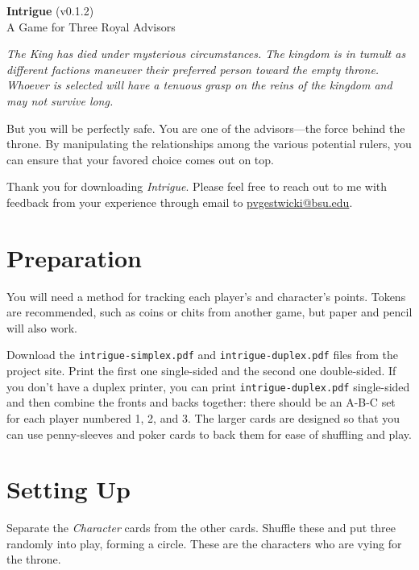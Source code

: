 \documentclass{article}
\begin{document}
\begin{centering}
  \Large{\textbf {Intrigue}} (v0.1.2)\\
  A Game for Three Royal Advisors\\
\end{centering}

\vspace{0.5cm}

{\itshape The King has died under mysterious circumstances. The
  kingdom is in tumult as different factions maneuver their preferred
  person toward the empty throne.  Whoever is selected will have a
  tenuous grasp on the reins of the kingdom and may not survive long.

  But you will be perfectly safe. You are one of the advisors---the force
  behind the throne. By manipulating the relationships among the
  various potential rulers, you can ensure that your favored
  choice comes out on top.
}

\vspace{0.5cm}

Thank you for downloading \textit{Intrigue}. Please feel free to reach
out to me with feedback from your experience through email to
\url{pvgestwicki@bsu.edu}. 


\section*{Preparation}

You will need a method for tracking each player's and character's
points.  Tokens are recommended, such as coins or chits from another
game, but paper and pencil will also work.

Download the \texttt{intrigue-simplex.pdf} and \texttt{intrigue-duplex.pdf}
files from the project site. Print the first one single-sided and the
second one double-sided. If you don't have a duplex printer, you
can print \texttt{intrigue-duplex.pdf} single-sided and then combine
the fronts and backs together: there should be an A-B-C set for
each player numbered 1, 2, and 3.
The larger cards are designed so that you can
use penny-sleeves and poker cards to back them for ease of shuffling
and play.


\section*{Setting Up}

Separate the \textit{Character} cards from the other cards.
Shuffle these and put three randomly into play, forming a circle.
These are the characters who are vying for the throne.
\end{document}
